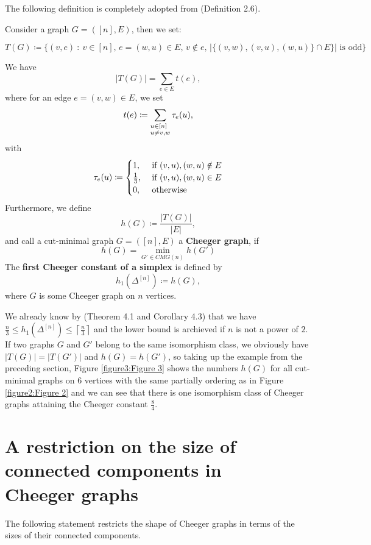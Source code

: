 The following definition is completely adopted from \cite{1} (Definition 2.6).
\begin{defi}\label{definition1}
Consider a graph \(G=([n],E)\), then we set:
\begin{small}
\[
T(G)\coloneqq \{(v,e)\: :\: v\in [n]\text{, }e=(w,u)\in E\text{, }v\notin e\text{, }|\{(v,w),(v,u),(w,u)\}\cap E\}|\text{ is odd}\}
\]
\end{small}
We have
\[
|T(G)|=\sum\limits_{e\in E}t(e),
\]
where for an edge \(e=(v,w)\in E\), we set
\[
t(e)\coloneqq \sum\limits_{\begin{subarray}{l}u\in[n]\\ u\neq v,w\end{subarray}}\tau_e(u),
\]
with
\begin{equation}
\tau_e(u)\coloneqq 
\begin{cases}
1,&\text{ if }(v,u),(w,u)\notin E\notag\\
\frac{1}{3},&\text{ if }(v,u),(w,u)\in E\notag\\
0,&\text{ otherwise}\notag
\end{cases}
\end{equation}
Furthermore, we define
\[
h(G)\coloneqq \frac{|T(G)|}{|E|},
\]
and call a cut-minimal graph \(G=([n],E)\) a \textbf{Cheeger graph}, if
\[
h(G)=\min\limits_{G'\in CMG(n)}h(G')
\]
The \textbf{first Cheeger constant of a simplex} is defined by
\[
h_1(\Delta^{[n]})\coloneqq h(G),
\]
where \(G\) is some Cheeger graph on \(n\) vertices.
\end{defi}
We already know by \cite{1} (Theorem 4.1 and Corollary 4.3) that we have \(\frac{n}{3}\leq h_1(\Delta^{[n]})\leq\left\lceil\frac{n}{3}\right\rceil\) and the lower bound is archieved if \(n\) is not a power of \(2\). If two graphs \(G\) and \(G'\) belong to the same isomorphism class, we obviously have \(|T(G)|=|T(G')|\) and \(h(G)=h(G')\), so taking up the example from the preceding section, Figure \ref{figure3:Figure 3} shows the numbers \(h(G)\) for all cut-minimal graphs on \(6\) vertices with the same partially ordering as in Figure \ref{figure2:Figure 2} and we can see that there is one isomorphism class of Cheeger graphs attaining the Cheeger constant \(\frac{8}{4}\).



\section{A restriction on the size of connected components in\\ Cheeger graphs}
The following statement restricts the shape of Cheeger graphs in terms of the sizes of their connected components.

